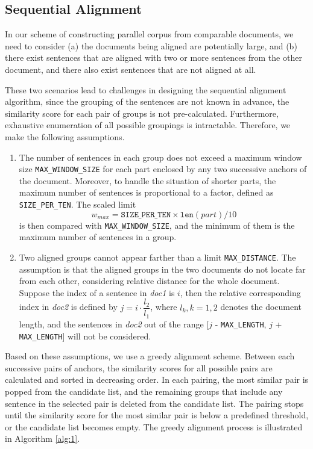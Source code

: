 \subsection{Sequential Alignment}

In our scheme of constructing parallel corpus from comparable documents, we need to consider (a) the documents being aligned are potentially large, and (b) there exist sentences that are aligned with two or more sentences from the other document, and there also exist sentences that are not aligned at all.

These two scenarios lead to challenges in designing the sequential alignment algorithm, since the grouping of the sentences are not known in advance, the similarity score for each pair of groups is not pre-calculated. Furthermore, exhaustive enumeration of all possible groupings is intractable. Therefore, we make the following assumptions.
\begin{enumerate}
	\item The number of sentences in each group does not exceed a maximum window size \texttt{MAX\_WINDOW\_SIZE} for each part enclosed by any two successive anchors of the document. Moreover, to handle the situation of shorter parts, the maximum number of sentences is proportional to a factor, defined as \texttt{SIZE\_PER\_TEN}. The scaled limit 
	$$w_{max} = \texttt{SIZE\_PER\_TEN} \times \texttt{len}(part) / 10$$
	is then compared with \texttt{MAX\_WINDOW\_SIZE}, and the minimum of them is the maximum number of sentences in a group. 
	\item Two aligned groups cannot appear farther than a limit \texttt{MAX\_DISTANCE}. The assumption is that the aligned groups in the two documents do not locate far from each other, considering relative distance for the whole document. Suppose the index of a sentence in \emph{doc1} is $i$, then the relative corresponding index in \emph{doc2} is defined by $j = i\cdot \dfrac{l_2}{l_1}$, where $l_k, k = 1, 2$ denotes the document length, and the sentences in \emph{doc2} out of the range [$j$ - \texttt{MAX\_LENGTH}, $j$ + \texttt{MAX\_LENGTH}] will not be considered.
\end{enumerate}

Based on these assumptions, we use a greedy alignment scheme. Between each successive pairs of anchors, the similarity scores for all possible pairs are calculated and sorted in decreasing order. In each pairing, the most similar pair is popped from the candidate list, and the remaining groups that include any sentence in the selected pair is deleted from the candidate list. The pairing stops until the similarity score for the most similar pair is below a predefined threshold, or the candidate list becomes empty. The greedy alignment process is illustrated in Algorithm \ref{alg:1}.

